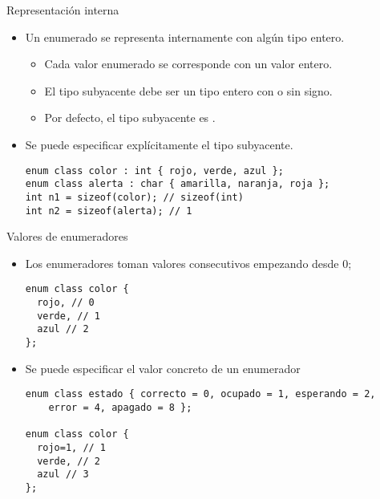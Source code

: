 \begin{frame}[t,fragile]{Representación interna}
\begin{itemize}
  \item Un enumerado se representa internamente con algún tipo entero.
    \begin{itemize}
      \item Cada valor enumerado se corresponde con un valor entero.
      \item El tipo subyacente debe ser un tipo entero con o sin signo.
      \item Por defecto, el tipo subyacente es .
    \end{itemize}

  \item Se puede especificar explícitamente el tipo subyacente.
\begin{lstlisting}
enum class color : int { rojo, verde, azul };
enum class alerta : char { amarilla, naranja, roja };
int n1 = sizeof(color); // sizeof(int)
int n2 = sizeof(alerta); // 1
\end{lstlisting}
\end{itemize}

\end{frame}

\begin{frame}[t,fragile]{Valores de enumeradores}
\begin{itemize}
  \item Los enumeradores toman valores consecutivos empezando desde 0;
\begin{lstlisting}
enum class color { 
  rojo, // 0
  verde, // 1
  azul // 2
};
\end{lstlisting}

  \item Se puede especificar el valor concreto de un enumerador
\begin{lstlisting}
enum class estado { correcto = 0, ocupado = 1, esperando = 2, 
    error = 4, apagado = 8 };

enum class color { 
  rojo=1, // 1
  verde, // 2
  azul // 3
};
\end{lstlisting}
\end{itemize}

\end{frame}


